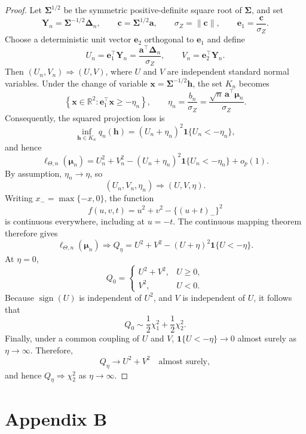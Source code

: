 \documentclass[11pt]{article}
\theoremstyle{remark}
\begin{document}
\begin{proof}
Let $\boldsymbol{\Sigma}^{1/2}$ be the symmetric positive-definite square root of $\boldsymbol{\Sigma}$, and set
$$\boldsymbol{Y}_n=\boldsymbol{\Sigma}^{-1/2}\boldsymbol{\Delta}_n,\qquad \boldsymbol{c}=\boldsymbol{\Sigma}^{1/2}\boldsymbol{a},\qquad \sigma_Z=\|\boldsymbol{c}\|,\qquad \boldsymbol{e}_1=\frac{\boldsymbol{c}}{\sigma_Z}.$$
Choose a deterministic unit vector $\boldsymbol{e}_2$ orthogonal to $\boldsymbol{e}_1$ and define
$$U_n=\boldsymbol{e}_1^{\top}\boldsymbol{Y}_n=\frac{\boldsymbol{a}^{\top}\boldsymbol{\Delta}_n}{\sigma_Z},\qquad V_n=\boldsymbol{e}_2^{\top}\boldsymbol{Y}_n.$$
Then $(U_n,V_n)\Rightarrow(U,V)$, where $U$ and $V$ are independent standard normal variables. Under the change of variable $\boldsymbol{x}=\boldsymbol{\Sigma}^{-1/2}\boldsymbol{h}$, the set $K_n$ becomes
$$\left\{\boldsymbol{x}\in\mathbb{R}^2:\boldsymbol{e}_1^{\top}\boldsymbol{x}\geq-\eta_n\right\},\qquad \eta_n=\frac{b_n}{\sigma_Z}=\frac{\sqrt{n}\,\boldsymbol{a}^{\top}\boldsymbol{\mu}_n}{\sigma_Z}.$$
Consequently, the squared projection loss is
$$\inf_{\boldsymbol{h}\in K_n}q_n(\boldsymbol{h})=(U_n+\eta_n)^2\mathbf{1}\{U_n<-\eta_n\},$$
and hence
$$\ell_{\Theta,n}(\boldsymbol{\mu}_n)=U_n^2+V_n^2-(U_n+\eta_n)^2\mathbf{1}\{U_n<-\eta_n\}+o_p(1).$$
By assumption, $\eta_n\to\eta$, so
$$(U_n,V_n,\eta_n)\Rightarrow(U,V,\eta).$$
Writing $x_-=\max\{-x,0\}$, the function
$$f(u,v,t)=u^2+v^2-\{(u+t)_-\}^2$$
is continuous everywhere, including at $u=-t$. The continuous mapping theorem therefore gives
$$\ell_{\Theta,n}(\boldsymbol{\mu}_n)\Rightarrow Q_\eta=U^2+V^2-(U+\eta)^2\mathbf{1}\{U<-\eta\}.$$
At $\eta=0$,
$$Q_0=\begin{cases}U^2+V^2,&U\geq0,\\V^2,&U<0.\end{cases}$$
Because $\operatorname{sign}(U)$ is independent of $U^2$, and $V$ is independent of $U$, it follows that
$$Q_0\sim\frac{1}{2}\chi_1^2+\frac{1}{2}\chi_2^2.$$
Finally, under a common coupling of $U$ and $V$, $\mathbf{1}\{U<-\eta\}\to0$ almost surely as $\eta\to\infty$. Therefore,
$$Q_\eta\longrightarrow U^2+V^2\quad\text{almost surely},$$
and hence $Q_\eta\Rightarrow\chi_2^2$ as $\eta\to\infty$.
\end{proof}




\section{\textbf{Appendix B}} \label{app:simulation}
\end{document}
